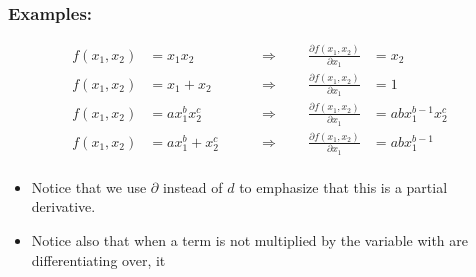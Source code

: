 \documentclass[10pt]{article}
\begin{document}
\subsubsection*{Examples:}
\begin{align*}
  f\left( x_1,x_2 \right)&= x_1 x_2
  & \qquad\Longrightarrow\qquad
  \frac{\partial f\left( x_1,x_2 \right)}{\partial x_1} &= x_2 \\
  f\left( x_1,x_2 \right)&= x_1  + x_2
  & \qquad\Longrightarrow\qquad
  \frac{\partial f\left( x_1,x_2 \right)}{\partial x_1} &= 1 \\
  f\left( x_1,x_2 \right)&= a x_1^b x_2^c
  & \qquad\Longrightarrow\qquad
  \frac{\partial f\left( x_1,x_2 \right)}{\partial x_1} &= abx_1^{b-1}x_2^c \\
  f\left( x_1,x_2 \right)&= a x_1^b  + x_2^c
  & \qquad\Longrightarrow\qquad
  \frac{\partial f\left( x_1,x_2 \right)}{\partial x_1} &= abx_1^{b-1} \\
\end{align*}
\begin{itemize}
  \item Notice that we use $\partial$ instead of $d$ to emphasize that this is a partial derivative.
  \item Notice also that when a term is not multiplied by the variable with are differentiating over, it 
\end{itemize}
\end{document}
